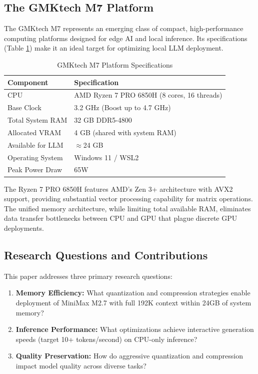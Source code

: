 \subsection{The GMKtech M7 Platform}

The GMKtech M7 represents an emerging class of compact, high-performance computing platforms designed for edge AI and local inference. Its specifications (Table \ref{tab:m7_specs}) make it an ideal target for optimizing local LLM deployment.

\begin{table}[h]
\centering
\caption{GMKtech M7 Platform Specifications}
\label{tab:m7_specs}
\begin{tabular}{ll}
\toprule
\textbf{Component} & \textbf{Specification} \\
\midrule
CPU & AMD Ryzen 7 PRO 6850H (8 cores, 16 threads) \\
Base Clock & 3.2 GHz (Boost up to 4.7 GHz) \\
Total System RAM & 32 GB DDR5-4800 \\
Allocated VRAM & 4 GB (shared with system RAM) \\
Available for LLM & $\approx$24 GB \\
Operating System & Windows 11 / WSL2 \\
Peak Power Draw & 65W \\
\bottomrule
\end{tabular}
\end{table}

The Ryzen 7 PRO 6850H features AMD's Zen 3+ architecture with AVX2 support, providing substantial vector processing capability for matrix operations. The unified memory architecture, while limiting total available RAM, eliminates data transfer bottlenecks between CPU and GPU that plague discrete GPU deployments.

\subsection{Research Questions and Contributions}

This paper addresses three primary research questions:

\begin{enumerate}[label=\textbf{RQ\arabic*:}]
    \item \textbf{Memory Efficiency:} What quantization and compression strategies enable deployment of MiniMax M2.7 with full 192K context within 24GB of system memory?
    \item \textbf{Inference Performance:} What optimizations achieve interactive generation speeds (target 10+ tokens/second) on CPU-only inference?
    \item \textbf{Quality Preservation:} How do aggressive quantization and compression impact model quality across diverse tasks?
\end{enumerate}

